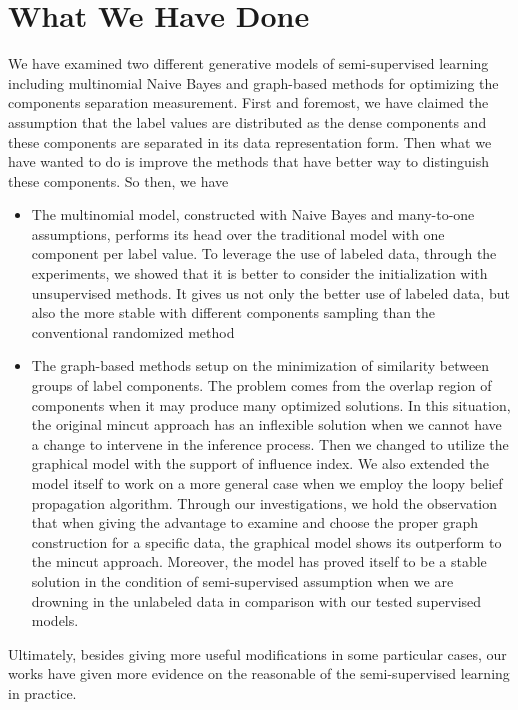 \section{What We Have Done}
We have examined two different generative models of semi-supervised learning including multinomial Naive Bayes and graph-based methods for optimizing the components separation measurement. First and foremost, we have claimed the assumption that the label values are distributed as the dense components and these components are separated in its data representation form. Then what we have wanted to do is improve the methods that have better way to distinguish these components. So then, we have
\begin{itemize}
	\item The multinomial model, constructed with Naive Bayes and many-to-one assumptions, performs its head over the traditional model with one component per label value. To leverage the use of labeled data, through the experiments, we showed that it is better to consider the initialization with unsupervised methods. It gives us not only the better use of labeled data, but also the more stable with different components sampling than the conventional randomized method
	
	\item The graph-based methods setup on the minimization of similarity between groups of label components. The problem comes from the overlap region of components when it may produce many optimized solutions. In this situation, the original mincut approach has an inflexible solution when we cannot have a change to intervene in the inference process. Then we changed to utilize the graphical model with the support of influence index. We also extended the model itself to work on a more general case when we employ the loopy belief propagation algorithm. Through our investigations, we hold the observation that when giving the advantage to examine and choose the proper graph construction for a specific data, the graphical model shows its outperform to the mincut approach. Moreover, the model has proved itself to be a stable solution in the condition of semi-supervised assumption when we are drowning in the unlabeled data in comparison with our tested supervised models.
\end{itemize}

Ultimately, besides giving more useful modifications in some particular cases, our works have given more evidence on the reasonable of the semi-supervised learning in practice.
 
